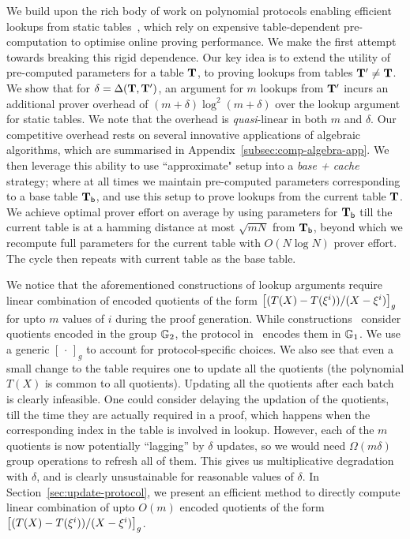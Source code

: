 \smallskip

 We build upon the rich body of work on polynomial protocols enabling efficient lookups from static tables~\cite{CCS:ZBKMNS22,EPRINT:PosKat22,EPRINT:ZGKMR22,EPRINT:EagFioGab22}, which rely on expensive table-dependent pre-computation
to optimise online proving performance. We make the first attempt towards breaking this rigid dependence.
Our key idea is to extend the utility of pre-computed
parameters for a table $\mathbf{T}$, to proving lookups from tables $\mathbf{T}'\neq \mathbf{T}$.
We show that for $\delta=\Delta(\mathbf{T}, \mathbf{T}')$,
an argument for $m$ lookups from $\mathbf{T}'$ incurs an additional prover overhead of $(m+\delta)\log^2(m+\delta)$ over the
lookup argument for static tables. We note that the overhead is {\em quasi}-linear in both $m$ and $\delta$.
Our competitive overhead rests on several innovative applications of algebraic
algorithms, which are summarised in Appendix~\ref{subsec:comp-algebra-app}. We then leverage this ability to use ``approximate"
setup into a {\em base + cache} strategy; where at all times we maintain pre-computed parameters corresponding to
a base table $\mathbf{T}_{\mathsf{b}}$, and use this setup to prove lookups from the current table $\mathbf{T}$. We achieve optimal
prover effort on average by using parameters for $\mathbf{T}_{\mathsf{b}}$ till the current table is at a hamming distance
at most $\sqrt{mN}$ from $\mathbf{T}_{\mathsf{b}}$, beyond which we recompute full parameters for the current table with
$O(N\log N)$ prover effort. The cycle then repeats with current table as the base table.

\smallskip

 We notice that the aforementioned constructions of lookup arguments require linear combination of
encoded quotients of the form $\left[{(T(X)-T(\xi^i))/(X-\xi^i)}\right]_g$ for upto $m$ values of $i$ during the proof generation.
While constructions~\cite{CCS:ZBKMNS22,EPRINT:PosKat22}
consider quotients encoded in the group $\mathbb{G}_2$, the protocol in~\cite{EPRINT:EagFioGab22} encodes them in $\mathbb{G}_1$.
We use a generic $[\,\cdot\,]_g$ to
account for protocol-specific choices. We also see that even a small change to the table requires one to update all the quotients (the polynomial $T(X)$ is
common to all quotients). Updating all the quotients after each batch is clearly infeasible. One could consider delaying the updation of the quotients, till
the time they are actually required in a proof, which happens when the corresponding index in the table is involved in lookup. However, each of the $m$ quotients
is now potentially ``lagging'' by $\delta$ updates, so we would need $\Omega(m\delta)$ group operations to refresh all of them. This gives us multiplicative degradation
with $\delta$, and is clearly unsustainable for reasonable values of $\delta$. In Section~\ref{sec:update-protocol}, we present an efficient method
to directly compute linear combination of upto $O(m)$ encoded quotients of the form $\left[{(T(X)-T(\xi^i))/(X-\xi^i)}\right]_g$.

